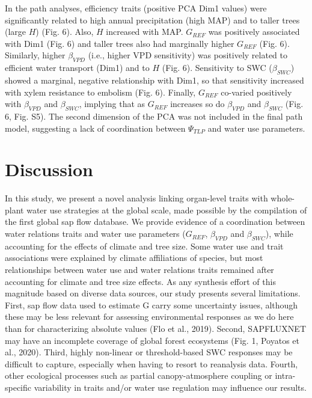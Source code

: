 \documentclass[11pt,twoside]{reedthesis}
\begin{document}
In the path analyses, efficiency traits (positive PCA Dim1 values) were
significantly related to high annual precipitation (high MAP) and to
taller trees (large \(H\)) (Fig. 6). Also, \(H\) increased with MAP.
\(G_{REF}\) was positively associated with Dim1 (Fig. 6) and taller
trees also had marginally higher \(G_{REF}\) (Fig. 6). Similarly, higher
\(\beta_{VPD}\) (i.e., higher VPD sensitivity) was positively related to
efficient water transport (Dim1) and to \(H\) (Fig. 6). Sensitivity to
SWC (\(\beta_{SWC}\)) showed a marginal, negative relationship with
Dim1, so that sensitivity increased with xylem resistance to embolism
(Fig. 6). Finally, \(G_{REF}\) co-varied positively with \(\beta_{VPD}\)
and \(\beta_{SWC}\), implying that as \(G_{REF}\) increases so do
\(\beta_{VPD}\) and \(\beta_{SWC}\) (Fig. 6, Fig. S5). The second
dimension of the PCA was not included in the final path model,
suggesting a lack of coordination between \(\Psi_{TLP}\) and water use
parameters.\par

\section{Discussion}\label{discussion}

In this study, we present a novel analysis linking organ-level traits
with whole-plant water use strategies at the global scale, made possible
by the compilation of the first global sap flow database. We provide
evidence of a coordination between water relations traits and water use
parameters (\(G_{REF}\), \(\beta_{VPD}\) and \(\beta_{SWC}\)), while
accounting for the effects of climate and tree size. Some water use and
trait associations were explained by climate affiliations of species,
but most relationships between water use and water relations traits
remained after accounting for climate and tree size effects. As any
synthesis effort of this magnitude based on diverse data sources, our
study presents several limitations. First, sap flow data used to
estimate G carry some uncertainty issues, although these may be less
relevant for assessing environmental responses as we do here than for
characterizing absolute values (Flo et al., 2019). Second, SAPFLUXNET
may have an incomplete coverage of global forest ecosystems (Fig. 1,
Poyatos et al., 2020). Third, highly non-linear or threshold-based SWC
responses may be difficult to capture, especially when having to resort
to reanalysis data. Fourth, other ecological processes such as partial
canopy-atmosphere coupling or intra-specific variability in traits
and/or water use regulation may influence our results.\par
\end{document}
